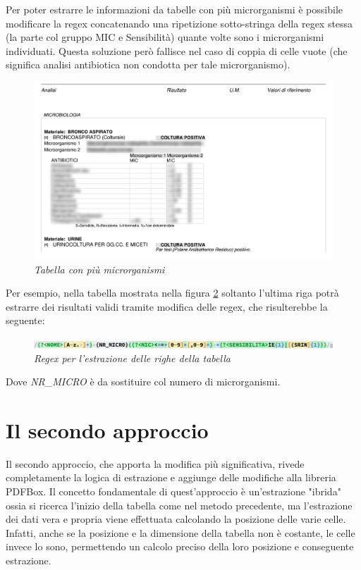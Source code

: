 Per poter estrarre le informazioni da tabelle con più microrganismi è possibile modificare la regex concatenando una ripetizione sotto-stringa della regex stessa (la parte col gruppo MIC e Sensibilità) quante volte sono i microrganismi individuati.
Questa soluzione però fallisce nel caso di coppia di celle vuote (che significa analisi antibiotica non condotta per tale microrganismo).
\newline
\begin{figure}[h!]
	\centering
	\includegraphics[width=.99\columnwidth]{images/content_multi_p1.png}
	\caption{\textit{Tabella con più microrganismi}}
	\label{fig:content_multi_1}
\end{figure}
\newline
Per esempio, nella tabella mostrata nella figura \ref{fig:content_multi_1} soltanto l'ultima riga potrà estrarre dei risultati validi tramite modifica delle regex, che risulterebbe la seguente:
\begin{figure}[h!]
	\centering
	\includegraphics[width=.99\columnwidth]{images/regex_2.png}
	\caption{\textit{Regex per l'estrazione delle righe della tabella}}
	\label{fig:content_multi_1}
\end{figure}
Dove \textit{NR\_MICRO} è da sostituire col numero di microrganismi.
\section{Il secondo approccio}
Il secondo approccio, che apporta la modifica più significativa, rivede completamente la logica di estrazione e aggiunge delle modifiche alla libreria PDFBox.
Il concetto fondamentale di quest'approccio è un'estrazione "ibrida" ossia si ricerca l'inizio della tabella come nel metodo precedente, ma l'estrazione dei dati vera e propria viene effettuata calcolando la posizione delle varie celle.
\newline
Infatti, anche se la posizione e la dimensione della tabella non è costante, le celle invece lo sono, permettendo un calcolo preciso della loro posizione e conseguente estrazione.
